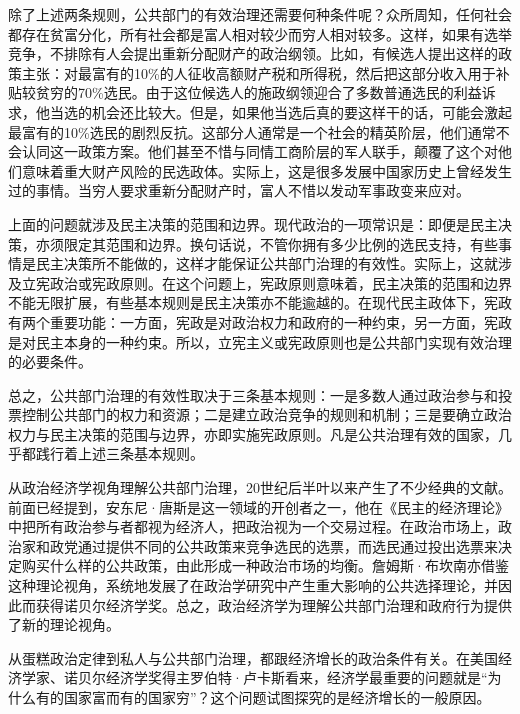 除了上述两条规则，公共部门的有效治理还需要何种条件呢？众所周知，任何社会都存在贫富分化，所有社会都是富人相对较少而穷人相对较多。这样，如果有选举竞争，不排除有人会提出重新分配财产的政治纲领。比如，有候选人提出这样的政策主张：对最富有的10\%的人征收高额财产税和所得税，然后把这部分收入用于补贴较贫穷的70\%选民。由于这位候选人的施政纲领迎合了多数普通选民的利益诉求，他当选的机会还比较大。但是，如果他当选后真的要这样干的话，可能会激起最富有的10\%选民的剧烈反抗。这部分人通常是一个社会的精英阶层，他们通常不会认同这一政策方案。他们甚至不惜与同情工商阶层的军人联手，颠覆了这个对他们意味着重大财产风险的民选政体。实际上，这是很多发展中国家历史上曾经发生过的事情。当穷人要求重新分配财产时，富人不惜以发动军事政变来应对。

上面的问题就涉及民主决策的范围和边界。现代政治的一项常识是：即便是民主决策，亦须限定其范围和边界。换句话说，不管你拥有多少比例的选民支持，有些事情是民主决策所不能做的，这样才能保证公共部门治理的有效性。实际上，这就涉及立宪政治或宪政原则。在这个问题上，宪政原则意味着，民主决策的范围和边界不能无限扩展，有些基本规则是民主决策亦不能逾越的。在现代民主政体下，宪政有两个重要功能：一方面，宪政是对政治权力和政府的一种约束，另一方面，宪政是对民主本身的一种约束。所以，立宪主义或宪政原则也是公共部门实现有效治理的必要条件。

总之，公共部门治理的有效性取决于三条基本规则：一是多数人通过政治参与和投票控制公共部门的权力和资源；二是建立政治竞争的规则和机制；三是要确立政治权力与民主决策的范围与边界，亦即实施宪政原则。凡是公共治理有效的国家，几乎都践行着上述三条基本规则。

从政治经济学视角理解公共部门治理，20世纪后半叶以来产生了不少经典的文献。前面已经提到，安东尼·唐斯是这一领域的开创者之一，他在《民主的经济理论》中把所有政治参与者都视为经济人，把政治视为一个交易过程。在政治市场上，政治家和政党通过提供不同的公共政策来竞争选民的选票，而选民通过投出选票来决定购买什么样的公共政策，由此形成一种政治市场的均衡。詹姆斯·布坎南亦借鉴这种理论视角，系统地发展了在政治学研究中产生重大影响的公共选择理论，并因此而获得诺贝尔经济学奖。总之，政治经济学为理解公共部门治理和政府行为提供了新的理论视角。


从蛋糕政治定律到私人与公共部门治理，都跟经济增长的政治条件有关。在美国经济学家、诺贝尔经济学奖得主罗伯特·卢卡斯看来，经济学最重要的问题就是“为什么有的国家富而有的国家穷”？这个问题试图探究的是经济增长的一般原因。

